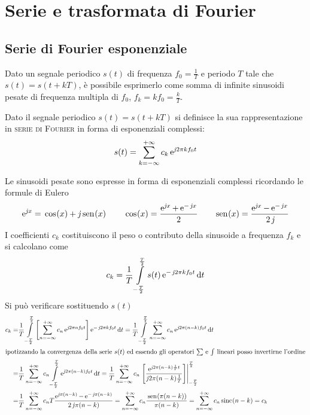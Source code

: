 \chapter{Serie e trasformata di Fourier}
\label{ch:teoriasegnali-capitolo2}
\section{Serie di Fourier esponenziale}
Dato un segnale periodico $s(t)$ di frequenza $f_0=\frac{1}{T}$ e periodo $T$ tale che $s(t)=s(t+k T)$, è possibile esprimerlo come somma di infinite sinusoidi pesate di frequenza multipla di $f_0$, $f_k=k f_0=\frac{k}{T}$.

\begin{definizione}
Dato il segnale periodico $s(t)=s(t+k T)$ si definisce la sua rappresentazione in \textsc{serie di Fourier} in forma di esponenziali complessi:
\begin{equation}
	\label{eq:serie_fourier}
	s(t)=\sum_{k=-\infty}^{+\infty} c_k \operatorname{e}^{\operatorname{\mathit{j}\!} 2\pi k f_0 t}
\end{equation}
\end{definizione}
Le sinusoidi pesate sono espresse in forma di esponenziali complessi ricordando le formule di Eulero
\begin{equation}
	\e{\imath x}=\cos{x}+\imath\sen{x}\qquad\cos{x}=\frac{\e{\imath x}+\e{-\imath x}}{2}\qquad\sen{x}=\frac{\e{\imath x}-\e{-\imath x}}{2\imath}
\end{equation}
I coefficienti $c_k$ costituiscono il peso o contributo della sinusoide a frequenza $f_k$ e si calcolano come
\begin{equation}
	\label{eq:serie_fourier_coef}
	c_k=\frac{1}{T}\int\limits_{-\frac{T}{2}}^{\frac{T}{2}}{s(t)\operatorname{e}^{-\operatorname{\mathit{j}\!} 2\pi k f_0 t}}{\,\mathop{}\!\mathrm{d}{t}}
\end{equation}
Si può verificare sostituendo $s(t)$
\begin{align*}
	c_k=&\frac{1}{T}\intd{-\frac{T}{2}}{\frac{T}{2}}{ \left[\sum_{n=-\infty}^{+\infty} c_n \e{\imath 2\pi n f_0 t}\right] \e{-\imath 2\pi k f_0 t}}{t} 
	=\frac{1}{T}\intd{-\frac{T}{2}}{\frac{T}{2}}{ \sum_{n=-\infty}^{+\infty} c_n \e{\imath 2\pi (n-k) f_0 t} }{t} \\
\intertext{ipotizzando la convergenza della serie $s(t)$ ed essendo gli operatori $\sum$ e $\int$ lineari posso invertirne l'ordine} 
	=&\frac{1}{T}\sum_{n=-\infty}^{+\infty} c_n \intd{-\frac{T}{2}}{\frac{T}{2}}{\e{\imath 2\pi(n-k)f_0 t}}{t}
	=\frac{1}{T}\sum_{n=-\infty}^{+\infty} c_n \bound{-\frac{T}{2}}{\frac{T}{2}}{\frac{\e{\imath 2\pi(n-k)\frac{1}{T}t}}{\imath 2\pi(n-k)\frac{1}{T} }}\\
	=&\frac{1}{T}\sum_{n=-\infty}^{+\infty} c_n T \frac{\e{\imath \pi(n-k)}-\e{-\imath\pi(n-k)}}{2\imath\pi(n-k)}
	=\sum_{n=-\infty}^{+\infty} c_n \frac{\sen{\pi(n-k)}}{\pi(n-k)}
	=\sum_{n=-\infty}^{+\infty} c_n \sinc{n-k} = c_k
\end{align*}
